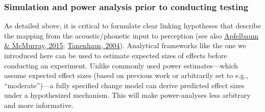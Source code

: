 \documentclass[
  11pt,
  english,
  man,floatsintext]{apa6}
\begin{document}
\hypertarget{simulation-and-power-analysis-prior-to-conducting-testing}{%
\subsubsection{Simulation and power analysis prior to conducting testing}\label{simulation-and-power-analysis-prior-to-conducting-testing}}

As detailed above, it is critical to formulate clear linking hypotheses that describe the mapping from the acoustic/phonetic input to perception (see also \protect\hyperlink{ref-apfelbaum-mcmurray2015}{Apfelbaum \& McMurray, 2015}; \protect\hyperlink{ref-tanenhaus2004}{Tanenhaus, 2004}). Analytical frameworks like the one we introduced here can be used to estimate expected sizes of effects before conducting an experiment. Unlike commonly used power estimates---which assume expected effect sizes (based on previous work or arbitrarily set to e.g., ``moderate'')---a fully specified change model can derive predicted effect sizes under a hypothesized mechanism. This will make power-analyses less arbitrary and more informative.
\end{document}

